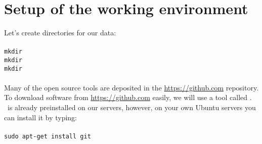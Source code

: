 \section{Setup of the working environment}
Let's create directories for our data:\\~\\
\texttt{mkdir \progDir \\
mkdir \workDir \\
mkdir \binDir}\\~\\

Many of the open source tools are deposited in the \url{https://github.com} repository.
To download software from \url{https://github.com} easily, we will use a tool called \git.
\git~is already preinstalled on our servers, however, on your own Ubuntu servers
you can install it by typing:\\~\\
\texttt{sudo apt-get install git}\\





